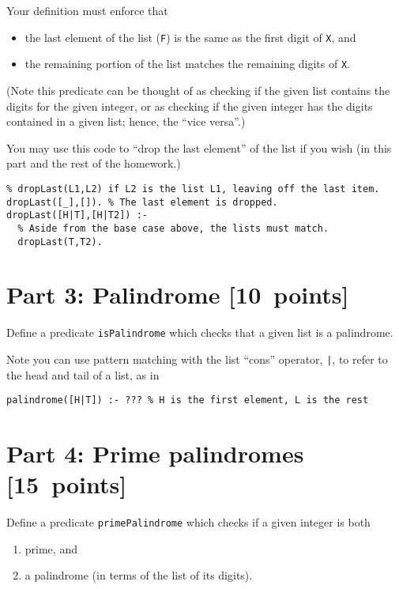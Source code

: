 \documentclass[11pt]{article}
\begin{document}
Your definition must enforce that
\begin{itemize}
\item the last element of the list (\texttt{F}) is the same
as the first digit of \texttt{X}, and
\item the remaining portion of the list matches the remaining
digits of \texttt{X}.
\end{itemize}

(Note this predicate can be thought of as checking if the given list contains
the digits for the given integer, or as checking if the given integer
has the digits contained in a given list; hence, the “vice versa”.)

You may use this code to “drop the last element” of the list
if you wish (in this part and the rest of the homework.)
\begin{verbatim}
% dropLast(L1,L2) if L2 is the list L1, leaving off the last item.
dropLast([_],[]). % The last element is dropped.
dropLast([H|T],[H|T2]) :-
  % Aside from the base case above, the lists must match.
  dropLast(T,T2).
\end{verbatim}

\section*{Part 3: Palindrome                                     [10 points]}
\label{sec:org7b5175f}
Define a predicate \texttt{isPalindrome} which checks that a given
list is a palindrome.

Note you can use pattern matching with the list “cons” operator, \texttt{|},
to refer to the head and tail of a list, as in
\begin{verbatim}
palindrome([H|T]) :- ??? % H is the first element, L is the rest
\end{verbatim}

\section*{Part 4: Prime palindromes                              [15 points]}
\label{sec:org8d758cf}

Define a predicate \texttt{primePalindrome} which checks
if a given integer is both
\begin{enumerate}
\item prime, and
\item a palindrome (in terms of the list of its digits).
\end{enumerate}
\end{document}
